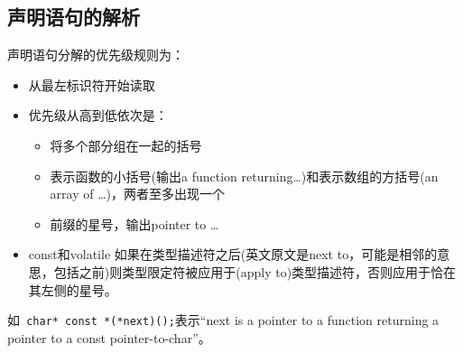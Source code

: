 \subsection{声明语句的解析}
声明语句分解的优先级规则为：
\begin{itemize}
    \item 从最左标识符开始读取
    \item 优先级从高到低依次是： 
        \begin{itemize}
            \item 将多个部分组在一起的括号 
            \item 表示函数的小括号(输出a function returning\dots)和表示数组的方括号(an array of \dots)，两者至多出现一个 
            \item 前缀的星号，输出pointer to \dots
        \end{itemize}
    \item const和volatile 如果在类型描述符之后(英文原文是next to，可能是相邻的意思，包括之前)则类型限定符被应用于(apply to)类型描述符，否则应用于恰在其左侧的星号。 
\end{itemize}

如\verb| char* const *(*next)();|表示``next is a pointer to a function returning a pointer to a const pointer-to-char''。














